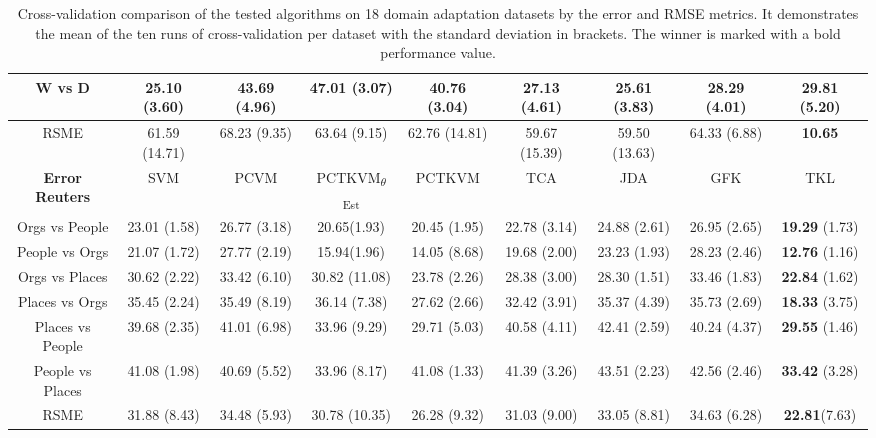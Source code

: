 \begin{table}[]
{\begin{tabular}{@{}ccccccccc@{}}
			W vs D                 & \textbf{25.10} (3.60)& 43.69 (4.96)& 47.01 (3.07)& 40.76  (3.04)& 27.13          (4.61)& 25.61 (3.83)& 28.29 (4.01)& 29.81   (5.20)       \\\midrule
			RSME                   & 61.59          (14.71)& 68.23 (9.35)& 63.64 (9.15)& 62.76  (14.81)& 59.67          (15.39)& 59.50 (13.63)& 64.33 (6.88)& \textbf{10.65} \\\midrule
			\textbf{Error Reuters} & SVM            & PCVM  & PCTKVM\textsubscript{$\theta$Est} & PCTKVM & TCA            & JDA   & GFK   & TKL            \\
			Orgs vs People         & 23.01          (1.58)& 26.77 (3.18)& 20.65(1.93)& 20.45  (1.95)& 22.78          (3.14)& 24.88 (2.61)& 26.95 (2.65)& \textbf{19.29} (1.73)\\
			People vs Orgs         & 21.07          (1.72)& 27.77 (2.19)& 15.94(1.96)& 14.05  (8.68)& 19.68          (2.00)& 23.23 (1.93)& 28.23 (2.46)& \textbf{12.76} (1.16)\\
			Orgs vs Places         & 30.62          (2.22)& 33.42 (6.10)& 30.82 (11.08)& 23.78  (2.26)& 28.38          (3.00)& 28.30 (1.51)& 33.46 (1.83)& \textbf{22.84} (1.62)\\
			Places vs Orgs         & 35.45          (2.24)& 35.49 (8.19)& 36.14 (7.38)& 27.62  (2.66)& 32.42          (3.91)& 35.37 (4.39)& 35.73 (2.69)& \textbf{18.33} (3.75)\\
			Places vs People       & 39.68          (2.35)& 41.01 (6.98)& 33.96 (9.29)& 29.71  (5.03)& 40.58          (4.11)& 42.41 (2.59)& 40.24 (4.37)& \textbf{29.55} (1.46)\\
			People vs Places       & 41.08          (1.98)& 40.69 (5.52)& 33.96 (8.17)& 41.08  (1.33)& 41.39          (3.26)& 43.51 (2.23)& 42.56 (2.46)& \textbf{33.42} (3.28)\\\midrule
			RSME                   & 31.88          (8.43)& 34.48 (5.93)&  30.78 (10.35)& 26.28  (9.32)& 31.03          (9.00)& 33.05 (8.81)& 34.63 (6.28)& \textbf{22.81}(7.63) \\ \bottomrule
	\end{tabular}}
	\caption[Complete Cross-Validtion Result of Error]{Cross-validation comparison of the tested algorithms on 18 domain adaptation datasets by the error and \acs{RMSE} metrics. It demonstrates the mean of the ten runs of cross-validation per dataset with the standard deviation in brackets. The winner is marked with a bold performance value.\label{BTableFTErr}}
\end{table}
